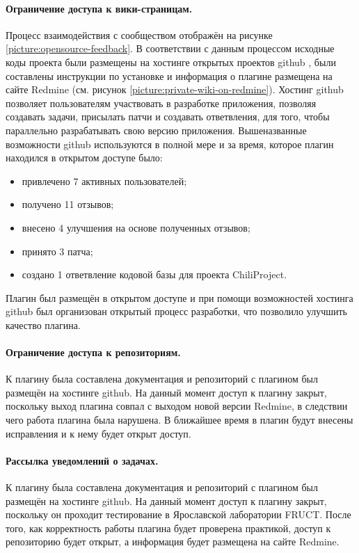 \paragraph{Ограничение доступа к вики-страницам.}
Процесс взаимодействия с сообществом отображён на рисунке
\ref{picture:opensource-feedback}. В соответствии с данным процессом исходные
коды проекта были размещены на хостинге открытых проектов github \cite{github},
были составлены инструкции по установке и информация о плагине размещена
\cite{private-wiki} на сайте Redmine (см. рисунок
\ref{picture:private-wiki-on-redmine}). Хостинг github позволяет пользователям
участвовать в разработке приложения, позволяя создавать задачи, присылать патчи
и создавать ответвления, для того, чтобы параллельно разрабатывать свою версию
приложения. Вышеназванные возможности github используются в полной мере и за
время, которое плагин находился в открытом доступе было:
\begin{itemize}
  \item привлечено 7 активных пользователей;
  \item получено 11 отзывов;
  \item внесено 4 улучшения на основе полученных отзывов; 
  \item принято 3 патча;
  \item создано 1 ответвление кодовой базы для проекта ChiliProject.
\end{itemize}
Плагин был размещён в открытом доступе и при помощи возможностей хостинга
github был организован открытый процесс разработки, что позволило улучшить
качество плагина.

\paragraph{Ограничение доступа к репозиториям.}
К плагину была составлена документация и репозиторий с плагином был размещён на
хостинге github. На данный момент доступ к плагину закрыт, поскольку выход
плагина совпал с выходом новой версии Redmine, в следствии чего работа плагина
была нарушена. В ближайшее время в плагин будут внесены исправления и к нему
будет открыт доступ.

\paragraph{Рассылка уведомлений о задачах.}
К плагину была составлена документация и репозиторий с плагином был размещён на
хостинге github. На данный момент доступ к плагину закрыт, поскольку он
проходит тестирование в Ярославской лаборатории FRUCT. После того, как
корректность работы плагина будет проверена практикой, доступ к репозиторию
будет открыт, а информация будет размещена на сайте Redmine.

